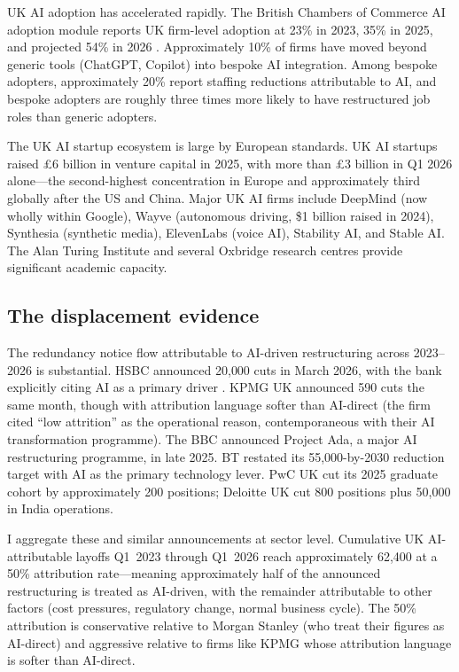 \documentclass[11pt,letterpaper]{article}
\theoremstyle{remark}
\begin{document}
{UK} {AI} adoption has accelerated rapidly. The British Chambers of Commerce {AI} adoption module reports {UK} firm-level adoption at 23\% in 2023, 35\% in 2025, and projected 54\% in 2026 \citep{bcc_atos_2026}. Approximately 10\% of firms have moved beyond generic tools (ChatGPT, Copilot) into bespoke {AI} integration. Among bespoke adopters, approximately 20\% report staffing reductions attributable to {AI}, and bespoke adopters are roughly three times more likely to have restructured job roles than generic adopters.

The {UK} {AI} startup ecosystem is large by European standards. {UK} {AI} startups raised \pounds6 billion in venture capital in 2025, with more than \pounds3 billion in Q1 2026 alone---the second-highest concentration in Europe and approximately third globally after the {US} and China. Major {UK} {AI} firms include {DeepMind} (now wholly within Google), {Wayve} (autonomous driving, \$1 billion raised in 2024), {Synthesia} (synthetic media), {ElevenLabs} (voice {AI}), {Stability AI}, and {Stable AI}. The Alan Turing Institute and several Oxbridge research centres provide significant academic capacity.

\subsection{The displacement evidence}

The redundancy notice flow attributable to {AI}-driven restructuring across 2023--2026 is substantial. {HSBC} announced 20{,}000 cuts in March 2026, with the bank explicitly citing {AI} as a primary driver \citep{morgan_stanley_2026}. {KPMG} {UK} announced 590 cuts the same month, though with attribution language softer than {AI}-direct (the firm cited ``low attrition'' as the operational reason, contemporaneous with their {AI} transformation programme). The {BBC} announced Project Ada, a major {AI} restructuring programme, in late 2025. {BT} restated its 55{,}000-by-2030 reduction target with {AI} as the primary technology lever. {PwC} {UK} cut its 2025 graduate cohort by approximately 200 positions; {Deloitte} {UK} cut 800 positions plus 50{,}000 in India operations.

I aggregate these and similar announcements at sector level. Cumulative {UK} {AI}-attributable layoffs Q1~2023 through Q1~2026 reach approximately 62{,}400 at a 50\% attribution rate---meaning approximately half of the announced restructuring is treated as {AI}-driven, with the remainder attributable to other factors (cost pressures, regulatory change, normal business cycle). The 50\% attribution is conservative relative to {Morgan Stanley} (who treat their figures as {AI}-direct) and aggressive relative to firms like {KPMG} whose attribution language is softer than {AI}-direct.
\end{document}
